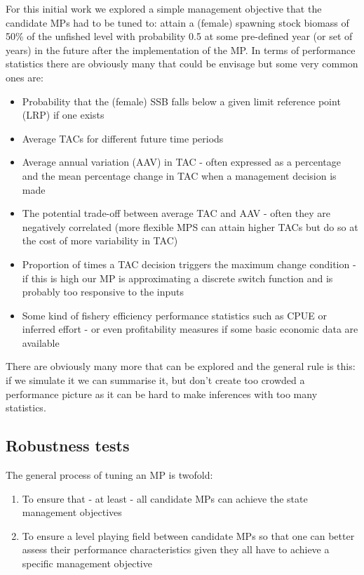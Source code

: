 \documentclass[12pt,a4paper,twoside,times,sky,standard]{csiroreport2017}
\begin{document}
For this initial work we explored a simple management objective that the candidate MPs had to be tuned to: attain a (female) spawning stock biomass of 50\% of the unfished level with probability 0.5 at some pre-defined year (or set of years) in the future after the implementation of the MP. In terms of performance statistics there are obviously many that could be envisage but some very common ones are:

\begin{itemize}
  \item Probability that the (female) SSB falls below a given limit reference point (LRP) if one exists
  \item Average TACs for different future time periods
  \item Average annual variation (AAV) in TAC - often expressed as a percentage and the mean percentage change in TAC when a management decision is made
  \item The potential trade-off between average TAC and AAV - often they are negatively correlated (more flexible MPS can attain higher TACs but do so at the cost of more variability in TAC)
  \item Proportion of times a TAC decision triggers the maximum change condition - if this is high our MP is approximating a discrete switch function and is probably too responsive to the inputs
  \item Some kind of fishery efficiency performance statistics such as CPUE or inferred effort - or even profitability measures if some basic economic data are available
\end{itemize}

There are obviously many more that can be explored and the general rule is this: if we simulate it we can summarise it, but don't create too crowded a performance picture as it can be hard to make inferences with too many statistics.

\subsection{Robustness tests}

The general process of tuning an MP \cite{mse,sbtmp} is twofold:

\begin{enumerate}
    \item To ensure that - at least - all candidate MPs can achieve the state management objectives
    \item To ensure a level playing field between candidate MPs so that one can better assess their performance characteristics given they all have to achieve a specific management objective
\end{enumerate}
\end{document}
